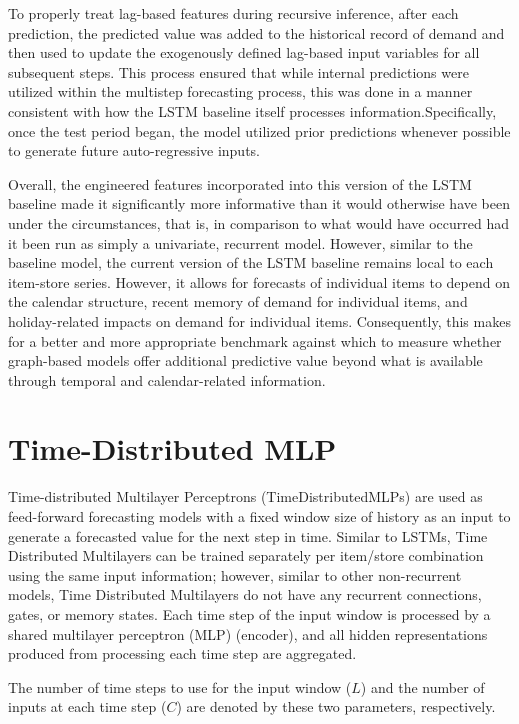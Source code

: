 To properly treat lag-based features during recursive inference, after each prediction, the predicted value was added to the historical record of demand and then used to update the exogenously defined lag-based input variables for all subsequent steps. This process ensured that while internal predictions were utilized within the multistep forecasting process, this was done in a manner consistent with how the LSTM baseline itself processes information.Specifically, once the test period began, the model utilized prior predictions whenever possible to generate future auto-regressive inputs.

Overall, the engineered features incorporated into this version of the LSTM baseline made it significantly more informative than it would otherwise have been under the circumstances, that is, in comparison to what would have occurred had it been run as simply a univariate, recurrent model. However, similar to the baseline model, the current version of the LSTM baseline remains local to each item-store series. However, it allows for forecasts of individual items to depend on the calendar structure, recent memory of demand for individual items, and holiday-related impacts on demand for individual items. Consequently, this makes for a better and more appropriate benchmark against which to measure whether graph-based models offer additional predictive value beyond what is available through temporal and calendar-related information.

\section{Time-Distributed MLP}

Time-distributed Multilayer Perceptrons (TimeDistributedMLPs) are used as feed-forward forecasting models with a fixed window size of history as an input to generate a forecasted value for the next step in time. Similar to LSTMs, Time Distributed Multilayers can be trained separately per item/store combination using the same input information; however, similar to other non-recurrent models, Time Distributed Multilayers do not have any recurrent connections, gates, or memory states. Each time step of the input window is processed by a shared multilayer perceptron (MLP) (encoder), and all hidden representations produced from processing each time step are aggregated.

The number of time steps to use for the input window (\(L\)) and the number of inputs at each time step (\(C\)) are denoted by these two parameters, respectively.

